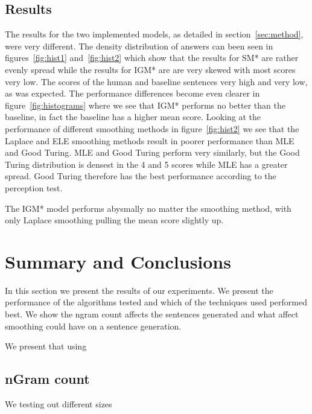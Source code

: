 \documentclass[a4paper,12pt]{article}
\begin{document}
\subsection{Results}
\label{sec:results}
The results for the two implemented models, as detailed in section~\ref{sec:method}, were very different. The density distribution of answers can been seen in figures~\ref{fig:hist1} and~\ref{fig:hist2} which show that the results for SM* are rather evenly spread while the results for IGM* are are very skewed with most scores very low. The scores of the human and baseline sentences very high and very low, as was expected. The performance differences become even clearer in figure~\ref{fig:histograms} where we see that IGM* performs no better than the baseline, in fact the baseline has a higher mean score. Looking at the performance of different smoothing methods in figure~\ref{fig:hist2} we see that the Laplace and ELE smoothing methods result in poorer performance than MLE and Good Turing. MLE and Good Turing perform very similarly, but the Good Turing distribution is densest in the 4 and 5 scores while MLE has a greater spread. Good Turing therefore has the best performance according to the perception test.

The IGM* model performs abysmally no matter the smoothing method, with only Laplace smoothing pulling the mean score slightly up.



\section{Summary and Conclusions}
\label{sec:summary}

In this section we present the results of our experiments. We present the performance of the algorithms tested and which of the techniques used performed best. We show the ngram count affects the sentences generated and what affect smoothing could have on a sentence generation.

We present that using

\subsection{nGram count}
We testing out different sizes 
\end{document}
